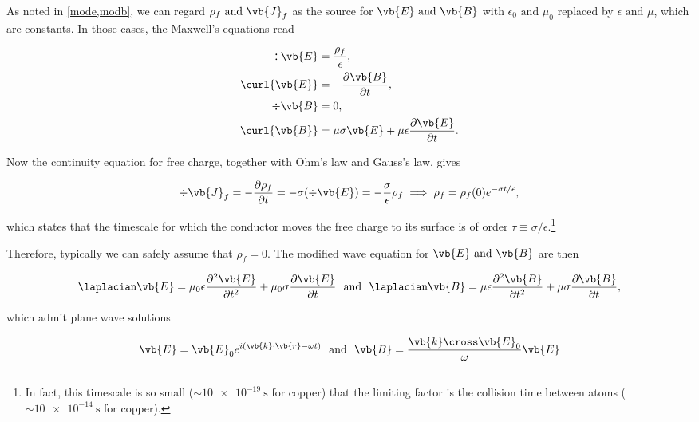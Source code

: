 \documentclass[english,a4paper,12pt]{report}
\begin{document}
As noted in \cref{mode,modb}, we can regard \(\rho _{f} \text { and }  \vb{J} _{f}  \) as the source for \(\vb{E} \text { and } \vb{B} \) with \(\epsilon_0 \text { and } \mu_0 \) replaced by \(\epsilon \text { and } \mu \), which are constants. In those cases, the Maxwell's equations read

\begin{equation}
    \begin{aligned}
        \div{\vb{E} } &= \frac{\rho _{f} }{\epsilon },\\
        \curl{\vb{E} } &= -\frac{\partial \vb{B} }{\partial t},\\
        \div{\vb{B} } &= 0,\\
        \curl{\vb{B} } &= \mu \sigma \vb{E} + \mu \epsilon \frac{\partial \vb{E} }{\partial t}. 
    \end{aligned}
\end{equation}

Now the continuity equation for free charge, together with Ohm's law and Gauss's law, gives 

\begin{equation}
    \div{\vb{J} _{f} } = -\frac{\partial \rho _{f} }{\partial t} = -\sigma (\div{\vb{E} } ) = -\frac{\sigma }{\epsilon } \rho _{f} \implies \rho _{f} = \rho _{f}(0) e^{- \sigma t/\epsilon },   
\end{equation}

which states that the timescale for which the conductor moves the free charge to its surface is of order \(\tau \equiv \sigma /\epsilon \).\footnote{In fact, this timescale is so small (\(\sim \SI{10e-19}{\second}\) for copper) that the limiting factor is the collision time between atoms (\(\sim \SI{10e-14}{\second} \) for copper).}  

Therefore, typically we can safely assume that \(\rho _{f} =0\). The modified wave equation for \(\vb{E} \text { and } \vb{B} \) are then 

\begin{equation}
    \laplacian \vb{E} = \mu_0 \epsilon \frac{\partial^2 \vb{E} }{\partial t^2} + \mu_0 \sigma \frac{\partial \vb{E} }{\partial t} ~\text { and }~ \laplacian \vb{B} = \mu \epsilon \frac{\partial^2 \vb{B} }{\partial t^2} + \mu \sigma \frac{\partial \vb{B} }{\partial t},   
\end{equation}

which admit plane wave solutions

\begin{equation}
    \vb{E} = \vb{E} _{0} e^{i(\vb{k} \cdot \vb{r} -\omega t)} ~\text { and }~ \vb{B} = \frac{\vb{k} \cross \vb{E} _{0} }{\omega }\vb{E}   
\end{equation}
\end{document}
